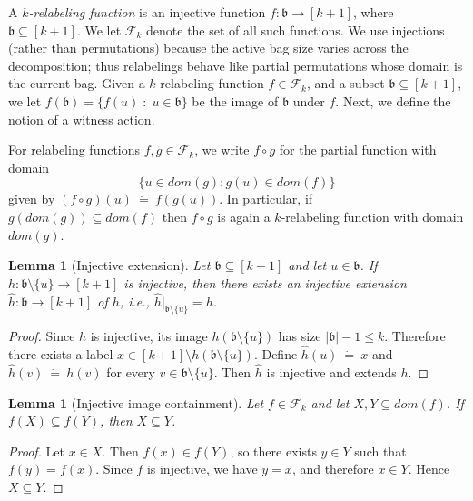 \documentclass[11pt,a4paper]{article}
\newtheorem{lemma}[theorem]{Lemma}
\newtheorem{definition}[theorem]{Definition}
\newcommand{\treewidthvalue}{k}
\newcommand{\abag}{\mathfrak{b}}
\newcommand{\defeq}{~\dot{=}~}
\newcommand{\vertexone}{u}
\newcommand{\vertextwo}{v}
\newcommand{\domain}{dom}
\newcommand{\relabelingfunction}{f}
\newcommand{\relabelclass}{\mathcal{F}}
\begin{document}
A \emph{$k$-relabeling function} is an injective function $\relabelingfunction: \abag \rightarrow [\treewidthvalue+1]$, where $\abag \subseteq [\treewidthvalue+1]$. We let $\relabelclass_\treewidthvalue$ denote the set of all such functions.
We use injections (rather than permutations) because the active bag size varies across the decomposition; thus relabelings behave like partial permutations whose domain is the current bag.
%
Given a $\treewidthvalue$-relabeling function
$\relabelingfunction\in \relabelclass_{\treewidthvalue}$, and a subset $\abag\subseteq [\treewidthvalue+1]$, we let $\relabelingfunction(\abag) = \{\relabelingfunction(\vertexone)\;:\; \vertexone \in \abag\}$ be the image of $\abag$ under $\relabelingfunction$. Next, we define the notion of a witness action.

For relabeling functions $f,g\in \relabelclass_{\treewidthvalue}$, we write $f\circ g$ for the partial function with domain
\[
\{u\in \domain(g) : g(u)\in \domain(f)\}
\]
given by $(f\circ g)(u)\defeq f(g(u))$. In particular, if $g(\domain(g))\subseteq \domain(f)$ then $f\circ g$ is again a $\treewidthvalue$-relabeling function with domain $\domain(g)$.

\begin{lemma}[Injective extension]
\label{lemma:injective-extension}
Let $\abag\subseteq [\treewidthvalue+1]$ and let $\vertexone\in \abag$.
If $h:\abag\setminus\{\vertexone\}\to [\treewidthvalue+1]$ is injective, then there exists an injective extension $\hat h:\abag\to[\treewidthvalue+1]$ of $h$, i.e., $\hat h|_{\abag\setminus\{\vertexone\}}=h$.
\end{lemma}
\begin{proof}
Since $h$ is injective, its image $h(\abag\setminus\{\vertexone\})$ has size $|\abag|-1\le \treewidthvalue$.
Therefore there exists a label $x\in [\treewidthvalue+1]\setminus h(\abag\setminus\{\vertexone\})$.
Define $\hat h(\vertexone)\defeq x$ and $\hat h(\vertextwo)\defeq h(\vertextwo)$ for every $\vertextwo\in \abag\setminus\{\vertexone\}$.
Then $\hat h$ is injective and extends $h$.
\end{proof}

\begin{lemma}[Injective image containment]
\label{lemma:injective-image-containment}
Let $f\in \relabelclass_{\treewidthvalue}$ and let $X,Y\subseteq \domain(f)$. If $f(X)\subseteq f(Y)$, then $X\subseteq Y$.
\end{lemma}
\begin{proof}
Let $x\in X$. Then $f(x)\in f(Y)$, so there exists $y\in Y$ such that $f(y)=f(x)$. Since $f$ is injective, we have $y=x$, and therefore $x\in Y$. Hence $X\subseteq Y$.
\end{proof}
\end{document}
